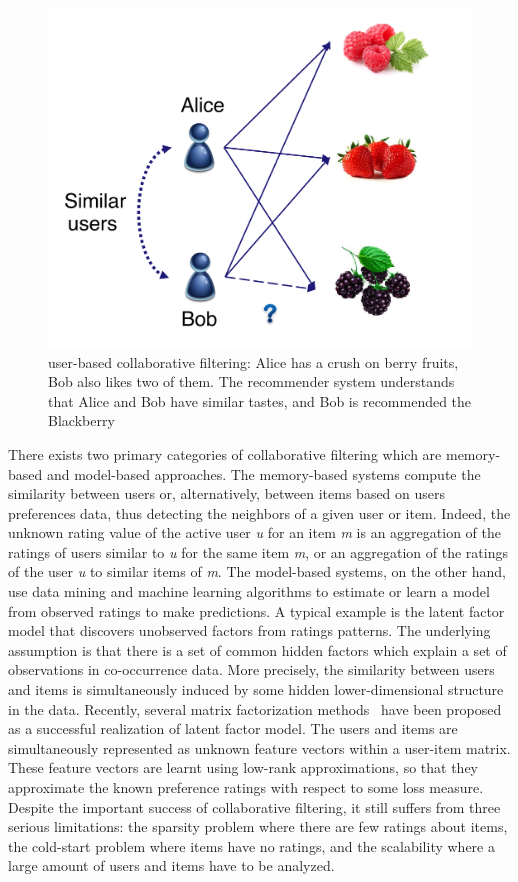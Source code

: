 \begin{figure}[H]
  \centering
  \includegraphics[scale=0.15]{user-cf.png}
  \caption{user-based collaborative filtering: Alice has a crush on berry fruits, Bob also likes two of them. The recommender system understands that Alice and Bob have similar tastes, and Bob is recommended the Blackberry}
  \label{fig:user-cf}
\end{figure}

There exists two primary categories of collaborative filtering which are memory-based and model-based approaches. The memory-based systems compute the similarity between users or, alternatively, between items based on users preferences data, thus detecting the neighbors of a given user or item. Indeed, the unknown rating value of the active user \emph{u} for an item \emph{m} is an aggregation of the ratings of users similar to \emph{u} for the same item \emph{m}, or an aggregation of the ratings of the user \emph{u} to similar items of \emph{m}. The model-based systems, on the other hand, use data mining and machine learning algorithms to estimate or learn a model from observed ratings to make predictions. A typical example is the latent factor model that discovers unobserved factors from ratings patterns. The underlying assumption is that there is a set of common hidden factors which explain a set of observations in co-occurrence data. More precisely, the similarity between users and items is simultaneously induced by some hidden lower-dimensional structure in the data. Recently, several matrix factorization methods~\cite{Koren:ICS2009} have been proposed as a successful realization of latent factor model. The users and items are simultaneously represented as unknown feature vectors within a user-item matrix. These feature vectors are learnt using low-rank approximations, so that they approximate the known preference ratings with respect to some loss measure. Despite the important success of collaborative filtering, it still suffers from three serious limitations: the sparsity problem where there are few ratings about items, the cold-start problem where items have no ratings, and the scalability where a large amount of users and items have to be analyzed.